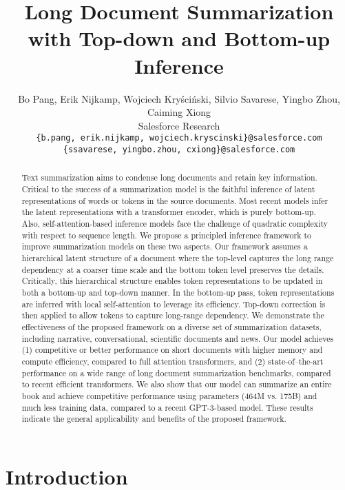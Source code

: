 \documentclass{article} \usepackage{iclr2022_conference,times}
\title{Long Document Summarization with Top-down and Bottom-up Inference}
\author{Bo Pang, Erik Nijkamp, Wojciech Kryściński, Silvio Savarese, Yingbo Zhou, Caiming Xiong  \\
Salesforce Research\\
\texttt{\{b.pang, erik.nijkamp, wojciech.kryscinski\}@salesforce.com}\\
\texttt{\{ssavarese, yingbo.zhou, cxiong\}@salesforce.com} 
}
\begin{document}
\maketitle

\begin{abstract}
Text summarization aims to condense long documents and retain key information. Critical to the success of a summarization model is the faithful inference of latent representations of words or tokens in the source documents. Most recent models infer the latent representations with a transformer encoder, which is purely bottom-up. Also, self-attention-based inference models face the challenge of quadratic complexity with respect to sequence length. We propose a principled inference framework to improve summarization models on these two aspects. Our framework assumes a hierarchical latent structure of a document where the top-level captures the long range dependency at a coarser time scale and the bottom token level preserves the details. Critically, this hierarchical structure enables token representations to be updated in both a bottom-up and top-down manner. In the bottom-up pass, token representations are inferred with local self-attention to leverage its efficiency. Top-down correction is then applied to allow tokens to capture long-range dependency. We demonstrate the effectiveness of the proposed framework on a diverse set of summarization datasets, including narrative, conversational, scientific documents and news. Our model achieves (1) competitive or better performance on short documents with higher memory and compute efficiency, compared to full attention transformers, and (2) state-of--the-art performance on a wide range of long document summarization benchmarks, compared to recent efficient transformers. We also show that our model can summarize an entire book and achieve competitive performance using  parameters (464M vs. 175B) and much less training data, compared to a recent GPT-3-based model. These results indicate the general applicability and benefits of the proposed framework. 
\end{abstract}

\section{Introduction}
\end{document}
